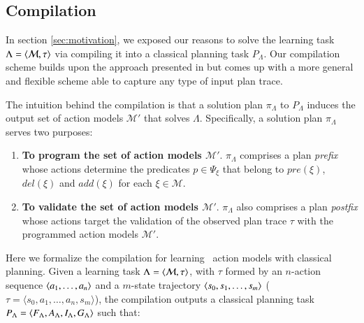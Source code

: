 \subsection{Compilation}
\label{compilation}

In section \ref{sec:motivation}, we exposed our reasons to solve the learning task $\Lambda={\langle \mathcal{M},\tau \rangle}$ via compiling it into a classical planning task $P_{\Lambda}$. Our compilation scheme  builds upon the approach presented in \cite{aineto2018learning} but \FAMA comes up with a more general and flexible scheme able to capture any type of input plan trace.

The intuition behind the \FAMA compilation is that a solution plan $\pi_\Lambda$ to $P_{\Lambda}$ induces the output set of action models $\mathcal{M}'$ that solves $\Lambda$. Specifically, a solution plan $\pi_\Lambda$ serves two purposes:

\begin{enumerate}
\item {\bf To program the set of action models $\mathcal{M}'$}. $\pi_\Lambda$ comprises a plan {\em prefix} whose actions determine the predicates $p\in \Psi_{\xi}$ that belong to $pre(\xi)$, $del(\xi)$ and $add(\xi)$ for each $\xi\in\mathcal{M}$.
\item {\bf To validate the set of action models $\mathcal{M}'$}. $\pi_\Lambda$ also comprises a plan {\em postfix} whose actions target the validation of the observed plan trace $\tau$ with the programmed action models $\mathcal{M}'$.
\end{enumerate}

Here we formalize the compilation for learning \strips\ action models with classical planning. Given a learning task $\Lambda={\langle \mathcal{M},\tau \rangle}$, with $\tau$ formed by an $n$-action sequence ${\langle a_1, \ldots, a_n \rangle}$ and a $m$-state trajectory ${\langle s_0, s_1, \ldots, s_m \rangle}$ ($\tau = \langle s_0, a_1, \ldots, a_n, s_m \rangle$), the compilation outputs a classical planning task $P_{\Lambda}={\langle F_{\Lambda},A_{\Lambda},I_{\Lambda},G_{\Lambda} \rangle}$ such that:

